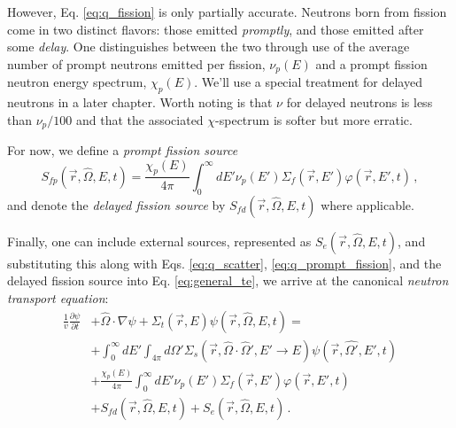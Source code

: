 However, Eq. \ref{eq:q_fission} is only partially accurate.  Neutrons born 
from fission come in two distinct flavors: those emitted \textit{promptly}, 
and those emitted after some \textit{delay}.  One distinguishes between the 
two through use of the average number of prompt neutrons emitted per 
fission, $\nu_p(E)$ and a prompt fission neutron energy spectrum, $\chi_p(E)$.  
We'll use a special treatment for delayed neutrons in a later chapter.  Worth 
noting is that $\nu$ for delayed neutrons is less than $\nu_p/100$ and that 
the associated $\chi$-spectrum is softer but more erratic. 

For now, we define a \textit{prompt fission source}
\begin{equation}
 S_{fp}(\vec{r},\hat{\Omega},E,t) = 
   \frac{\chi_p(E)}{4\pi} \int^{\infty}_{0} dE' 
   \nu_p(E')\Sigma_f(\vec{r},E')\varphi(\vec{r},E',t) \, ,
\label{eq:q_prompt_fission}
\end{equation}
and denote the \textit{delayed fission source} by 
$S_{fd}(\vec{r},\hat{\Omega},E,t)$ where applicable.

Finally, one can include external sources, represented 
as $S_{e}(\vec{r},\hat{\Omega},E,t)$, and substituting this along with 
Eqs. \ref{eq:q_scatter}, \ref{eq:q_prompt_fission}, and the delayed 
fission source into Eq. \ref{eq:general_te}, we arrive at the 
canonical \textit{neutron transport equation}:
\begin{equation}
  \begin{split}
     \frac{1}{v}\frac{\partial \psi}{\partial t} &+ \hat{\Omega} \cdot \nabla \psi + \Sigma_t(\vec{r},E) \psi(\vec{r},\hat{\Omega},E,t) = \\
           &+ \int^{\infty}_{0} dE' \int_{4\pi} d\Omega' \Sigma_s(\vec{r},\hat{\Omega}\cdot\hat{\Omega}',E'\to E)\psi(\vec{r},\hat{\Omega'},E',t) \\
           &+ \frac{\chi_p(E)}{4\pi} \int^{\infty}_{0} dE' \nu_p(E')\Sigma_f(\vec{r},E')\varphi(\vec{r},E',t) \\
           &+ S_{fd}(\vec{r},\hat{\Omega},E,t)  + S_{e}(\vec{r},\hat{\Omega},E,t) \, .
  \end{split}
  \label{eq:neutron_te}
\end{equation}

